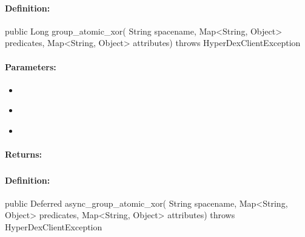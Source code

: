 \paragraph{Definition:}
\begin{javacode}
public Long group_atomic_xor(
        String spacename,
        Map<String, Object> predicates,
        Map<String, Object> attributes) throws HyperDexClientException
\end{javacode}

\paragraph{Parameters:}
\begin{itemize}[noitemsep]
\item {}\\

\item {}\\

\item {}\\

\end{itemize}

\paragraph{Returns:}


\pagebreak
\subsubsection{}
\label{api:java:async_group_atomic_xor}


\paragraph{Definition:}
\begin{javacode}
public Deferred async_group_atomic_xor(
        String spacename,
        Map<String, Object> predicates,
        Map<String, Object> attributes) throws HyperDexClientException
\end{javacode}

